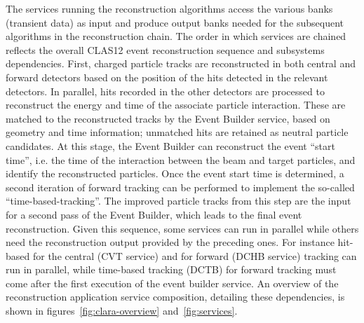The services running the reconstruction algorithms access the various banks (transient data) as input
and produce output banks needed for the subsequent algorithms in the reconstruction chain.
The order in which services are chained reflects the overall CLAS12 event reconstruction sequence and subsystems dependencies. First, charged particle tracks are reconstructed in both central and forward detectors based on the position of the hits detected in the relevant detectors. In parallel, hits recorded in the other detectors are processed to reconstruct the energy and time of the associate particle interaction. These are matched to the reconstructed tracks by the Event Builder service, based on geometry and time information; unmatched hits are retained as neutral particle candidates. At this stage, the Event Builder can reconstruct the event ``start time'', i.e. the time of the interaction between the beam and target particles, and identify the reconstructed particles. Once the event start time is determined, a second iteration of forward tracking can be performed to implement the so-called ``time-based-tracking''. The improved particle tracks from this step are the input for a second pass of the Event Builder, which leads to the final event reconstruction. Given this sequence, some services can run in parallel while others need the reconstruction output provided by the preceding ones.
For instance hit-based for the central (CVT service) and for forward (DCHB service) tracking
can run in parallel, while time-based tracking (DCTB) for forward tracking must come after the first execution of the event builder service.
An  overview of the reconstruction application service composition, detailing these dependencies, is shown in figures~\ref{fig:clara-overview} and~\ref{fig:services}.



